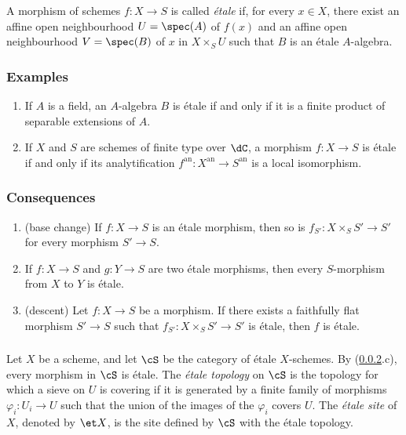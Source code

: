 \documentclass[oneside]{book}
\begin{document}
A morphism of schemes $f:X\to S$ is called \emph{étale} if, for every
$x\in X$, there exist an affine open neighbourhood $U=\spec(A)$ of
$f(x)$ and an affine open neighbourhood $V=\spec(B)$ of $x$ in
$X\times_SU$ such that $B$ is an étale $A$-algebra.

\subsubsection{Examples}\label{I:2-1-2}
\begin{enumerate}[\indent a)]
  \item If $A$ is a field, an $A$-algebra $B$ is étale if and only if it
    is a finite product of separable extensions of $A$.
  \item If $X$ and $S$ are schemes of finite type over $\dC$, a morphism
    $f:X\to S$ is étale if and only if its analytification
    $f^{\text{an}}:X^{\text{an}}\to S^{\text{an}}$ is a local
    isomorphism.
\end{enumerate}

\subsubsection{Consequences}\label{I:2-1-3}
\begin{enumerate}[\indent a)]
  \item (base change) If $f:X\to S$ is an étale morphism, then so is
    $f_{S'}:X\times_SS'\to S'$ for every morphism $S'\to S$.
  \item If $f:X\to S$ and $g:Y\to S$ are two étale morphisms, then every
    $S$-morphism from $X$ to $Y$ is étale.
  \item (descent) Let $f:X\to S$ be a morphism. If there exists a
    faithfully flat morphism $S'\to S$ such that
    $f_{S'}:X\times_SS'\to S'$ is étale, then $f$ is étale.
\end{enumerate}

\subsubsection{}\label{I:2-1-4}

Let $X$ be a scheme, and let $\cS$ be the category of étale
$X$-schemes. By (\ref{I:2-1-3}.c), every morphism in $\cS$ is étale.
The \emph{étale topology} on $\cS$ is the topology for which a sieve on
$U$ is covering if it is generated by a finite family of morphisms
$\varphi_i:U_i\to U$ such that the union of the images of the
$\varphi_i$ covers $U$. The \emph{étale site} of $X$, denoted by
$\et X$, is the site defined by $\cS$ with the étale topology.
\end{document}
